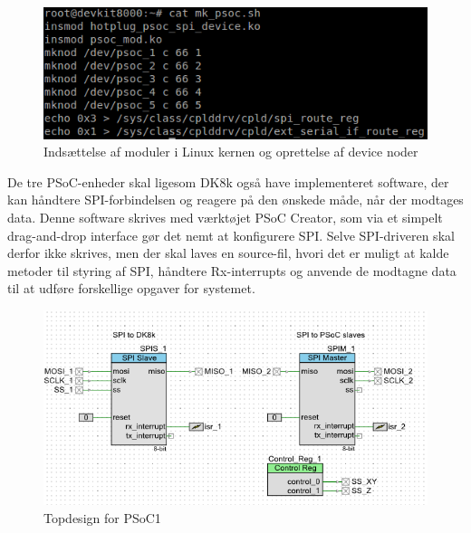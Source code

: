 \begin{figure}[H]
\includegraphics[scale=0.9]{Screenshots/Devkit_cat_mk_psoc}
\caption{Indsættelse af moduler i Linux kernen og oprettelse af device noder}
\end{figure}

De tre PSoC-enheder skal ligesom DK8k også have implementeret software, der kan håndtere SPI-forbindelsen og reagere
på den ønskede måde, når der modtages data. Denne software skrives med værktøjet PSoC Creator, som via et simpelt drag-and-drop interface gør det
nemt at konfigurere SPI. Selve SPI-driveren skal derfor ikke skrives, men der skal laves en source-fil, hvori det er muligt at kalde metoder til
styring af SPI, håndtere Rx-interrupts og anvende de modtagne data til at udføre forskellige opgaver for systemet.

\begin{figure}[H]
\includegraphics[scale=0.8]{Screenshots/PSOC_opstilling_spi}
\caption{Topdesign for PSoC1}
\end{figure}

